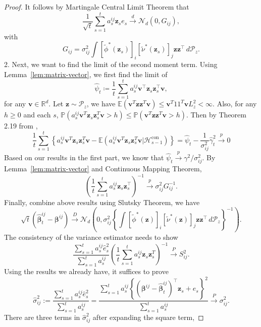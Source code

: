 \documentclass[12pt]{article}
\begin{document}
\begin{proof}
It follows by Martingale Central Limit Theorem that
\[
\frac{1}{\sqrt{t}} \sum_{s=1}^t a_s^{ij} \bm{z}_s e_s \xrightarrow{d} \mathcal{N}_d(0, G_{ij}),
\]
with
\[
G_{ij} = \sigma_{ij}^2 \int [\widetilde \phi^\ast(\bm{z}_s)]_i [\widetilde \nu^\ast(\bm{z}_s)]_j \bm{z} \bm{z}^\top \,d\mathcal{P}_z.
\]
2. Next, we want to find the limit of the second moment term. Using Lemma~\ref{lem:matrix-vector}, we first find the limit of 
\[
\widehat{\psi}_t \coloneqq \frac{1}{t} \sum_{s=1}^{t} a_s^{ij} \bm{v}^\top \bm{z}_s \bm{z}_s^{\top} \bm{v},
\]
for any $\bm{v} \in \mathbb{R}^d$. Let $\bm{z} \sim \mathcal{P}_z$, we have $\mathbb{E}(\bm{v}^T \bm{z}\bm{z}^T \bm{v}) \leq \bm{v}^T 11^T \bm{v} L_z^2 < \infty$. Also, for any $h \geq 0$ and each $s$,  
$\mathbb{P}(a_s^{ij} \bm{v}^T \bm{z}_s \bm{z}_s^T \bm{v} > h) \leq \mathbb{P}(\bm{v}^T \bm{z}\bm{z}^T\bm{v} > h).$ Then by Theorem 2.19 from \citet{hall1980martingale},  
\begin{equation*}
    \frac{1}{t} \sum_{s=1}^t \left\{ a_s^{ij} \bm{v}^T \bm{z}_s \bm{z}_s^T \bm{v} - \mathbb{E} \left( a_s^{ij} \bm{v}^T \bm{z}_s \bm{z}_s^T \bm{v} | \mathcal{H}^{\mathrm{con}}_{s-1} \right) \right\} = \widehat{\psi}_t - \frac{1}{\sigma_{ij}^2} \widehat{\gamma}_t^2 \overset{p}{\to} 0
\end{equation*}
Based on our results in the first part, we know that $\widehat{\psi}_t \overset{p}{\to} \gamma^2 / \sigma_{ij}^2$. By Lemma~\ref{lem:matrix-vector} and Continuous Mapping Theorem,
\[
\left(\frac{1}{t} \sum_{s=1}^{t} a_s^{ij} \bm{z}_s \bm{z}_s^{\top} \right)^{-1} \overset{p}{\to} \sigma_{ij}^2G_{ij}^{-1}.
\]
Finally, combine above results using Slutsky Theorem, we have 
\[
\sqrt{t}\left(\widehat{\bm{\beta}}_t^{ij} - \bm{\beta}^{ij}\right) \overset{D}{\to} \mathcal{N}_d \left( 0, \sigma_{ij}^2 \left\{ \int [\widetilde \phi^\ast(\bm{z})]_i [\widetilde \nu^\ast(\bm{z})]_j \bm{z} \bm{z}^\top \,d\mathcal{P}_z \right\}^{-1} \right).
\]
The consistency of the variance estimator needs to show
\[
\frac{\sum_{s=1}^{t} a_s^{ij}\widehat{e}_s^2}{\sum_{s=1}^{t} a_s^{ij}} \left( \frac{1}{t} \sum_{s=1}^{t} a_s^{ij} \bm{z}_s \bm{z}_s^T \right)^{-1} \overset{P}{\rightarrow} S_{ij}^2.
\]
Using the results we already have, it suffices to prove
\[
\widehat{\sigma}_{ij}^2 := \frac{\sum_{s=1}^{t} a_s^{ij}\widehat{e}_s^2}{\sum_{s=1}^{t} a_s^{ij}} = \frac{\sum_{s=1}^{t} a_s^{ij} \left\{(\bm{\beta}^{ij} - \widehat{\bm{\beta}}_t^{ij})^\top \bm{z}_s + e_s \right\}^2}{\sum_{s=1}^{t} a_s^{ij}} \overset{P}{\rightarrow} \sigma_{ij}^2.
\]
There are three terms in $\widehat{\sigma}_{ij}^2$ after expanding the square term, 

\end{proof}
\end{document}
